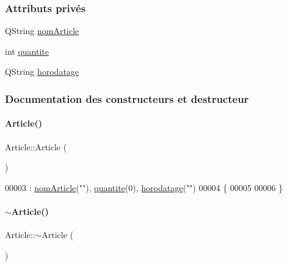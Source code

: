 \subsubsection*{Attributs privés}
\begin{DoxyCompactItemize}
\item 
Q\+String \hyperlink{class_article_a0ba6c08f7dd54e4b7caf673ecd6b41a6}{nom\+Article}
\item 
int \hyperlink{class_article_a4bb0882b68de349e913fd0b46bf6da6a}{quantite}
\item 
Q\+String \hyperlink{class_article_ae7a9ee7f0b2bd423ff995819fa78ac17}{horodatage}
\end{DoxyCompactItemize}


\subsubsection{Documentation des constructeurs et destructeur}
\mbox{\label{class_article_aba1b3142ede0565d468cb4135384c96f}} 
\paragraph{\texorpdfstring{Article()}{Article()}}
{\footnotesize\ttfamily Article\+::\+Article (\begin{DoxyParamCaption}{ }\end{DoxyParamCaption})}


\begin{DoxyCode}
00003                 : \hyperlink{class_article_a0ba6c08f7dd54e4b7caf673ecd6b41a6}{nomArticle}(\textcolor{stringliteral}{""}), \hyperlink{class_article_a4bb0882b68de349e913fd0b46bf6da6a}{quantite}(0), \hyperlink{class_article_ae7a9ee7f0b2bd423ff995819fa78ac17}{horodatage}(\textcolor{stringliteral}{""})
00004 \{
00005 
00006 \}
\end{DoxyCode}
\mbox{\label{class_article_a5c429e49b30104b1069044d0e1a6aa1a}} 
\paragraph{\texorpdfstring{$\sim$\+Article()}{~Article()}}
{\footnotesize\ttfamily Article\+::$\sim$\+Article (\begin{DoxyParamCaption}{ }\end{DoxyParamCaption})}


